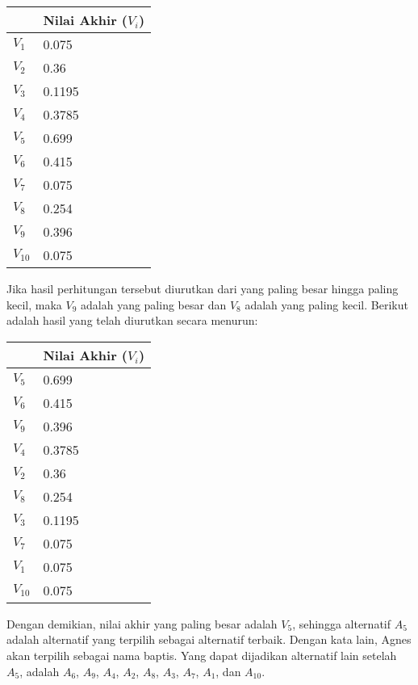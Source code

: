 \documentclass[a4paper,twoside]{article}
\begin{document}
\begin{enumerate}
\begin{center}
    \begin{tabular}{| l | l | }
    \hline
     & Nilai Akhir ($V_{i}$)  \\ \hline
   $V_{1}$ & 0.075 \\ \hline
   $V_{2}$ & 0.36   \\ \hline
	 $V_{3}$ & 0.1195  \\ \hline
   $V_{4}$ & 0.3785   \\ \hline
	 $V_{5}$ & 0.699  \\ \hline
   $V_{6}$ & 0.415   \\ \hline
	 $V_{7}$ & 0.075  \\ \hline
   $V_{8}$ & 0.254   \\ \hline
	 $V_{9}$ & 0.396  \\ \hline
   $V_{10}$ & 0.075   \\ 
    \hline
    \end{tabular}
\end{center}

Jika hasil perhitungan tersebut diurutkan dari yang paling besar hingga paling kecil, maka $V_{9}$ adalah yang paling besar dan $V_{8}$ adalah yang paling kecil. Berikut adalah hasil yang telah diurutkan secara menurun:

\begin{center}
    \begin{tabular}{| l | l | }
    \hline
     & Nilai Akhir ($V_{i}$)  \\ \hline
  $V_{5}$ & 0.699  \\ \hline 
	$V_{6}$ & 0.415   \\ \hline
	$V_{9}$ & 0.396    \\ \hline
	$V_{4}$ & 0.3785 \\ \hline
	$V_{2}$ & 0.36 \\ \hline
	$V_{8}$ & 0.254  \\ \hline
   $V_{3}$ & 0.1195   \\ \hline
	 $V_{7}$ & 0.075   \\ \hline
   $V_{1}$ & 0.075   \\ \hline	 
   $V_{10}$ & 0.075  \\ 
	     \hline
    \end{tabular}
\end{center}


Dengan demikian, nilai akhir yang paling besar adalah $V_{5}$, sehingga alternatif $A_{5}$ adalah alternatif yang terpilih sebagai alternatif terbaik. Dengan kata lain, Agnes akan terpilih sebagai nama baptis. Yang dapat dijadikan alternatif lain setelah $A_{5}$, adalah $A_{6}$, $A_{9}$, $A_{4}$, $A_{2}$, $A_{8}$, $A_{3}$, $A_{7}$, $A_{1}$, dan $A_{10}$. 



\end{enumerate}
\end{document}

